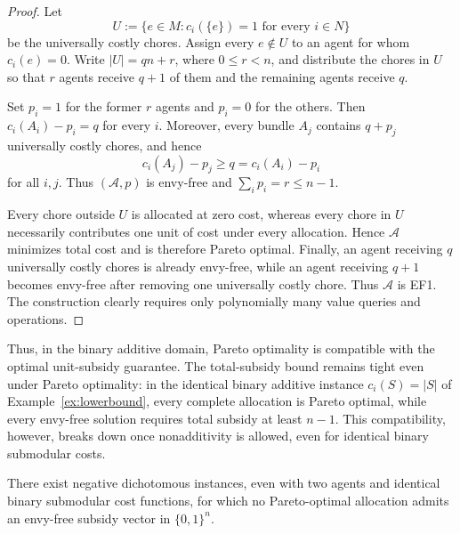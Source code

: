 \begin{proof}
Let
\[
  U:=\{e\in M:c_i(\{e\})=1\text{ for every }i\in N\}
\]
be the universally costly chores. Assign every $e\notin U$ to an agent for whom
$c_i(e)=0$. Write $|U|=qn+r$, where $0\le r<n$, and distribute the chores in $U$
so that $r$ agents receive $q+1$ of them and the remaining agents receive $q$.

Set $p_i=1$ for the former $r$ agents and $p_i=0$ for the others. Then
$c_i(A_i)-p_i=q$ for every $i$. Moreover, every bundle $A_j$ contains $q+p_j$
universally costly chores, and hence
\[
  c_i(A_j)-p_j\ge q=c_i(A_i)-p_i
\]
for all $i,j$. Thus $(\mathcal A,p)$ is envy-free and $\sum_i p_i=r\le n-1$.

Every chore outside $U$ is allocated at zero cost, whereas every chore in $U$
necessarily contributes one unit of cost under every allocation. Hence
$\mathcal A$ minimizes total cost and is therefore Pareto optimal. Finally, an
agent receiving $q$ universally costly chores is already envy-free, while an
agent receiving $q+1$ becomes envy-free after removing one universally costly
chore. Thus $\mathcal A$ is EF1. The construction clearly requires only
polynomially many value queries and operations.
\end{proof}

Thus, in the binary additive domain, Pareto optimality is compatible with the
optimal unit-subsidy guarantee. The total-subsidy bound remains tight even under
Pareto optimality: in the identical binary additive instance $c_i(S)=|S|$ of
Example~\ref{ex:lowerbound}, every complete allocation is Pareto optimal, while
every envy-free solution requires total subsidy at least $n-1$. This
compatibility, however, breaks down once nonadditivity is allowed, even for
identical binary submodular costs.

\begin{proposition}
\label{prop:po-impossibility}
There exist negative dichotomous instances, even with two agents and identical
binary submodular cost functions, for which no Pareto-optimal allocation admits
an envy-free subsidy vector in $\{0,1\}^n$.
\end{proposition}

